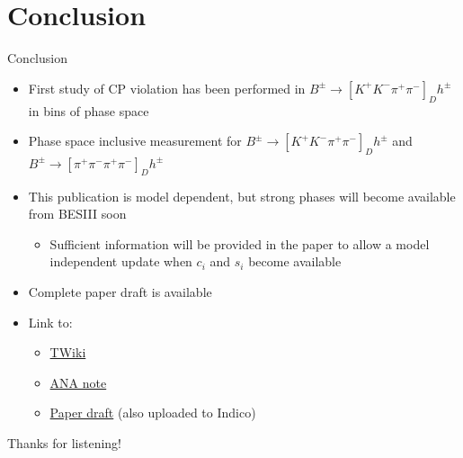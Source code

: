 \documentclass{beamer}
\begin{document}
\section{Conclusion}

\begin{frame}{Conclusion}
  \begin{itemize}
    \setlength\itemsep{0.5em}
    \item{First study of CP violation has been performed in $B^\pm\to[K^+K^-\pi^+\pi^-]_D h^\pm$ in bins of phase space}
    \item{Phase space inclusive measurement for $B^\pm\to[K^+K^-\pi^+\pi^-]_D h^\pm$ and $B^\pm\to[\pi^+\pi^-\pi^+\pi^-]_D h^\pm$}
    \item{This publication is model dependent, but strong phases will become available from BESIII soon}
    \begin{itemize}
      \item{Sufficient information will be provided in the paper to allow a model independent update when $c_i$ and $s_i$ become available}
    \end{itemize}
    \item{Complete paper draft is available}
    \item{Link to:}
    \begin{itemize}
      \item{\href{https://twiki.cern.ch/twiki/bin/viewauth/LHCbPhysics/GGSZB2DhD2hhpipiModelIndependent}{TWiki}}
      \item{\href{https://twiki.cern.ch/twiki/pub/LHCbPhysics/GGSZB2DhD2hhpipiModelIndependent/LHCb-ANA-2021-051-v9.pdf}{ANA note}}
      \item{\href{https://twiki.cern.ch/twiki/pub/LHCbPhysics/GGSZB2DhD2hhpipiModelIndependent/LHCb-PAPER-2022-XXX-v0.pdf}{Paper draft} (also uploaded to Indico)}
    \end{itemize}
  \end{itemize}
  \begin{center}
    \huge Thanks for listening!
  \end{center}
\end{frame}
\end{document}
